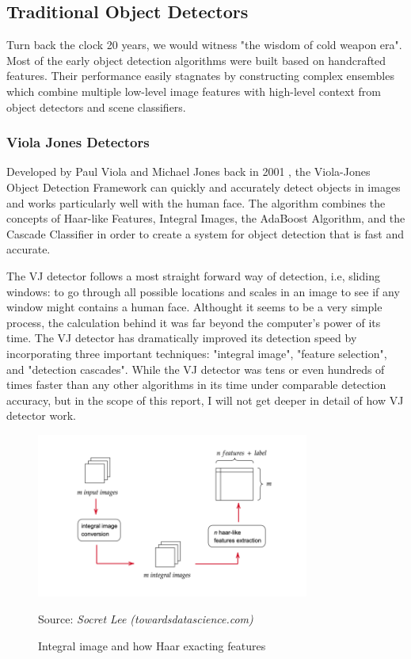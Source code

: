 \documentclass[12pt]{article}
\newcommand{\source}[1]{\caption*{Source: \emph{#1}} }
\begin{document}
\subsection{Traditional Object Detectors}
\label{sec:tradional}
Turn back the clock 20 years, we would witness "the wisdom of cold weapon era". Most 
of the early object detection algorithms were built based on handcrafted features. 
Their performance easily stagnates by constructing complex ensembles which 
combine multiple low-level image features with high-level context 
from object detectors and scene classifiers. 

\subsubsection{Viola Jones Detectors}
\label{sec:viola}
Developed by Paul Viola and Michael Jones back in 2001 \cite{viola2001rapid}, 
the Viola-Jones Object Detection Framework can quickly and accurately 
detect objects in images and works particularly well with the human face.
The algorithm combines the concepts of Haar-like Features, Integral Images, 
the AdaBoost Algorithm, and the Cascade Classifier in order to create a system for 
object detection that is fast and accurate.

The VJ detector follows a most straight forward way of detection, i.e, sliding windows:
to go through all possible locations and scales in an image to see if any window might 
contains a human face. Althought it seems to be a very simple process, the calculation 
behind it was far beyond the computer's power of its time.
The VJ detector has dramatically improved its detection speed by incorporating three 
important techniques: "integral image", "feature selection", and "detection cascades".
While the VJ detector was tens or even hundreds of times faster than any other algorithms in its 
time under comparable detection accuracy, but in the scope of 
this report, I will not get deeper in detail of how VJ detector work.
\begin{figure}[htp]
    \centering
    \includegraphics[width=0.8\textwidth]{images/vj_detector_process.png}
    \caption{Integral image and how Haar exacting features}
    \label{fig:haar}
    \source{Socret Lee (towardsdatascience.com)}
\end{figure}
\end{document}
